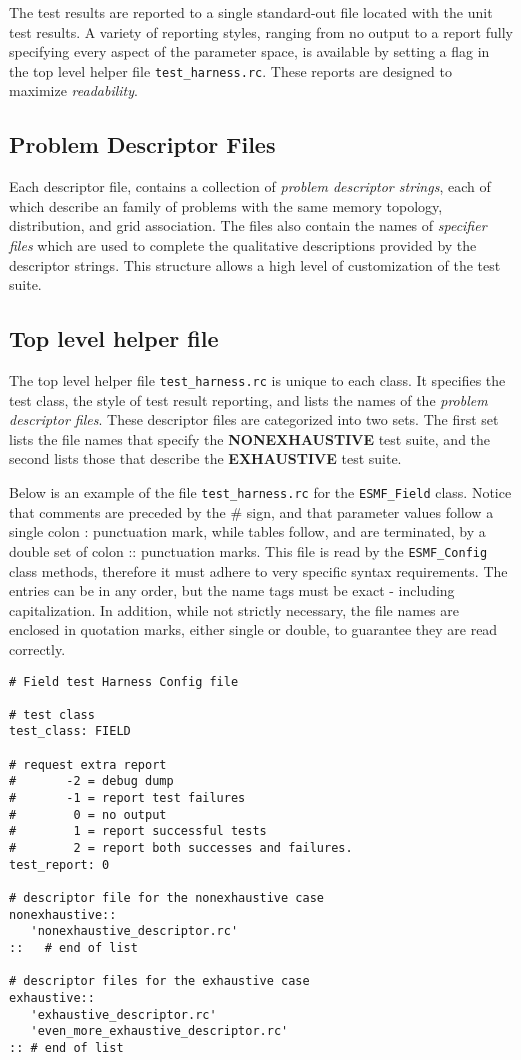 \documentclass{article}
\begin{document}
The test results are reported to a single standard-out file located with the unit test results. A variety of reporting styles, ranging from no output to a report fully specifying every aspect of the parameter space, is available by setting a flag in the top level helper file \texttt{test\_harness.rc}. These reports are designed to maximize  \textit{readability}.

\subsection{Problem Descriptor Files}
Each descriptor file, contains a collection of \textit{problem descriptor strings}, each of which describe an family of problems with the same memory topology, distribution, and grid association. The files also contain the names of \textit{specifier files} which are used to complete the qualitative descriptions provided by the descriptor strings. This structure allows a high level of customization of the test suite.


\subsection{Top level helper file}
The top level helper file \texttt{test\_harness.rc} is unique to each class. It specifies the test class, the style of test result reporting, and lists the names of the \textit{problem descriptor files}. These descriptor files are categorized into two sets. The first set lists the file names that specify the \textbf{NONEXHAUSTIVE} test suite, and the second lists those that describe the \textbf{EXHAUSTIVE} test suite. 

Below is an example of the file \texttt{test\_harness.rc} for the \texttt{ESMF\_Field} class. Notice that comments are preceded by the {\#} sign, and that parameter values follow a single colon {:} punctuation mark, while tables follow, and are terminated, by a double set of colon {::} punctuation marks.  This file is read by the \texttt{ESMF\_Config} class methods, therefore it must adhere to very specific syntax requirements. The entries can be in any order, but the name tags must be exact - including capitalization. In addition, while not strictly necessary, the file names are enclosed in quotation marks, either single or double, to guarantee they are read correctly.
\begin{verbatim}
# Field test Harness Config file

# test class
test_class: FIELD 

# request extra report
#       -2 = debug dump
#       -1 = report test failures 
#        0 = no output
#        1 = report successful tests
#        2 = report both successes and failures.
test_report: 0 

# descriptor file for the nonexhaustive case
nonexhaustive::
   'nonexhaustive_descriptor.rc'
::   # end of list

# descriptor files for the exhaustive case
exhaustive::
   'exhaustive_descriptor.rc'
   'even_more_exhaustive_descriptor.rc'
:: # end of list
\end{verbatim}
\end{document}
